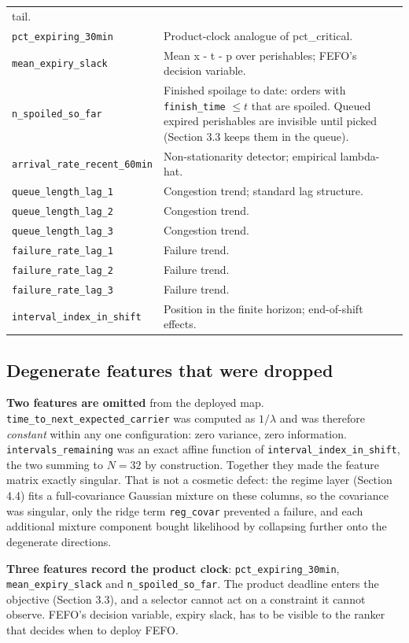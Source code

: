 \documentclass[review,3p,times]{elsarticle}
\theoremstyle{definition}
\begin{document}
{\begin{longtable}[]{@{}
  >{\raggedright\arraybackslash}p{}
  >{\raggedright\arraybackslash}p{}@{}}
tail. \\
\texttt{pct\_expiring\_30min} & Product-clock analogue of
pct\_critical. \\
\texttt{mean\_expiry\_slack} & Mean x - t - p over perishables; FEFO's
decision variable. \\
\texttt{n\_spoiled\_so\_far} & Finished spoilage to date: orders with
\texttt{finish\_time} \(\le t\) that are spoiled. Queued expired
perishables are invisible until picked (Section 3.3 keeps them in the
queue). \\
\texttt{arrival\_rate\_recent\_60min} & Non-stationarity detector;
empirical lambda-hat. \\
\texttt{queue\_length\_lag\_1} & Congestion trend; standard lag
structure. \\
\texttt{queue\_length\_lag\_2} & Congestion trend. \\
\texttt{queue\_length\_lag\_3} & Congestion trend. \\
\texttt{failure\_rate\_lag\_1} & Failure trend. \\
\texttt{failure\_rate\_lag\_2} & Failure trend. \\
\texttt{failure\_rate\_lag\_3} & Failure trend. \\
\texttt{interval\_index\_in\_shift} & Position in the finite horizon;
end-of-shift effects. \\
\end{longtable}
}

\subsection{Degenerate features that were
dropped}\label{degenerate-features-that-were-dropped}

\textbf{Two features are omitted} from the deployed map.
\texttt{time\_to\_next\_expected\_carrier} was computed as \(1/\lambda\)
and was therefore \emph{constant} within any one configuration: zero
variance, zero information. \texttt{intervals\_remaining} was an exact
affine function of \texttt{interval\_index\_in\_shift}, the two summing
to \(N = 32\) by construction. Together they made the feature matrix
exactly singular. That is not a cosmetic defect: the regime layer
(Section 4.4) fits a full-covariance Gaussian mixture on these columns,
so the covariance was singular, only the ridge term \texttt{reg\_covar}
prevented a failure, and each additional mixture component bought
likelihood by collapsing further onto the degenerate directions.

\textbf{Three features record the product clock}:
\texttt{pct\_expiring\_30min}, \texttt{mean\_expiry\_slack} and
\texttt{n\_spoiled\_so\_far}. The product deadline enters the objective
(Section 3.3), and a selector cannot act on a constraint it cannot
observe. FEFO's decision variable, expiry slack, has to be visible to
the ranker that decides when to deploy FEFO.
\end{document}
